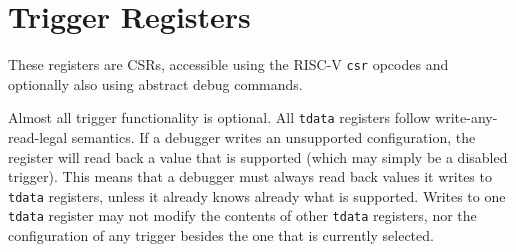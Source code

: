 \section{Trigger Registers}

These registers are CSRs, accessible using the RISC-V {\tt csr} opcodes and
optionally also using abstract debug commands.

Almost all trigger functionality is optional. All {\tt tdata} registers follow
write-any-read-legal semantics. If a debugger writes an unsupported
configuration, the register will read back a value that is supported (which may
simply be a disabled trigger).  This means that a debugger must always read
back values it writes to {\tt tdata} registers, unless it already knows already
what is
supported.  Writes to one {\tt tdata} register may not modify the contents of
other {\tt tdata} registers, nor the configuration of any trigger besides the
one that is currently selected.


